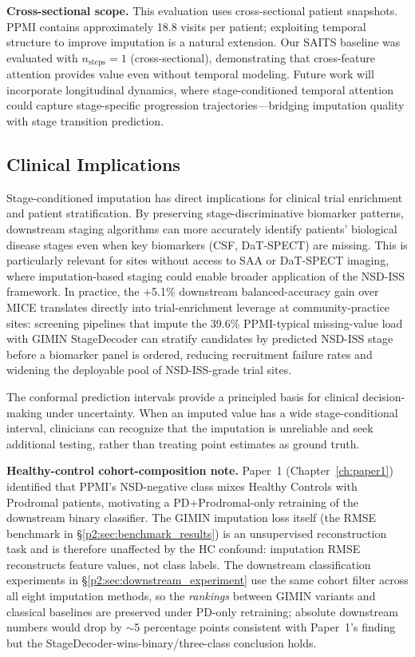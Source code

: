 \textbf{Cross-sectional scope.} This evaluation uses cross-sectional patient snapshots. PPMI contains approximately 18.8 visits per patient; exploiting temporal structure to improve imputation is a natural extension. Our SAITS baseline was evaluated with $n_{\text{steps}} = 1$ (cross-sectional), demonstrating that cross-feature attention provides value even without temporal modeling. Future work will incorporate longitudinal dynamics, where stage-conditioned temporal attention could capture stage-specific progression trajectories---bridging imputation quality with stage transition prediction.

\subsection{Clinical Implications}

Stage-conditioned imputation has direct implications for clinical trial enrichment and patient stratification. By preserving stage-discriminative biomarker patterns, downstream staging algorithms can more accurately identify patients' biological disease stages even when key biomarkers (CSF, DaT-SPECT) are missing. This is particularly relevant for sites without access to SAA or DaT-SPECT imaging, where imputation-based staging could enable broader application of the NSD-ISS framework. In practice, the +5.1\% downstream balanced-accuracy gain over MICE translates directly into trial-enrichment leverage at community-practice sites: screening pipelines that impute the 39.6\% PPMI-typical missing-value load with GIMIN StageDecoder can stratify candidates by predicted NSD-ISS stage before a biomarker panel is ordered, reducing recruitment failure rates and widening the deployable pool of NSD-ISS-grade trial sites.

The conformal prediction intervals provide a principled basis for clinical decision-making under uncertainty. When an imputed value has a wide stage-conditional interval, clinicians can recognize that the imputation is unreliable and seek additional testing, rather than treating point estimates as ground truth.

\textbf{Healthy-control cohort-composition note.} Paper~1 (Chapter~\ref{ch:paper1}) identified that PPMI's NSD-negative class mixes Healthy Controls with Prodromal patients, motivating a PD+Prodromal-only retraining of the downstream binary classifier. The GIMIN imputation loss itself (the RMSE benchmark in \S\ref{p2:sec:benchmark_results}) is an unsupervised reconstruction task and is therefore unaffected by the HC confound: imputation RMSE reconstructs feature values, not class labels. The downstream classification experiments in \S\ref{p2:sec:downstream_experiment} use the same cohort filter across all eight imputation methods, so the \emph{rankings} between GIMIN variants and classical baselines are preserved under PD-only retraining; absolute downstream numbers would drop by $\sim$5 percentage points consistent with Paper~1's finding but the StageDecoder-wins-binary/three-class conclusion holds.

